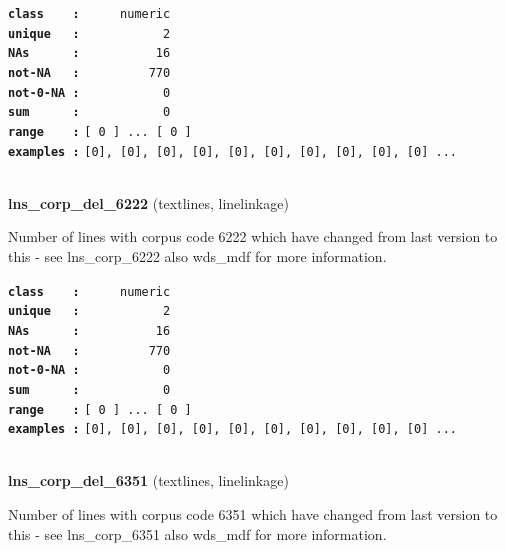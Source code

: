 \documentclass[]{article}
\begin{document}
\textbf{\texttt{class\ \ \ \ :}} \texttt{~~~~~numeric}\\
\textbf{\texttt{unique\ \ \ :}} \texttt{~~~~~~~~~~~2}\\
\textbf{\texttt{NAs\ \ \ \ \ \ :}} \texttt{~~~~~~~~~~16}\\
\textbf{\texttt{not-NA\ \ \ :}} \texttt{~~~~~~~~~770}\\
\textbf{\texttt{not-0-NA\ :}} \texttt{~~~~~~~~~~~0}\\
\textbf{\texttt{sum\ \ \ \ \ \ :}} \texttt{~~~~~~~~~~~0}\\
\textbf{\texttt{range\ \ \ \ :}}
\texttt{{[}\ 0\ {]}\ ...\ {[}\ 0\ {]}}\\
\textbf{\texttt{examples\ :}}
\texttt{{[}0{]},\ {[}0{]},\ {[}0{]},\ {[}0{]},\ {[}0{]},\ {[}0{]},\ {[}0{]},\ {[}0{]},\ {[}0{]},\ {[}0{]}\ ...}\\

~

\textbf{lns\_corp\_del\_6222} (textlines, linelinkage)

Number of lines with corpus code 6222 which have changed from last
version to this - see lns\_corp\_6222 also wds\_mdf for more
information.

\textbf{\texttt{class\ \ \ \ :}} \texttt{~~~~~numeric}\\
\textbf{\texttt{unique\ \ \ :}} \texttt{~~~~~~~~~~~2}\\
\textbf{\texttt{NAs\ \ \ \ \ \ :}} \texttt{~~~~~~~~~~16}\\
\textbf{\texttt{not-NA\ \ \ :}} \texttt{~~~~~~~~~770}\\
\textbf{\texttt{not-0-NA\ :}} \texttt{~~~~~~~~~~~0}\\
\textbf{\texttt{sum\ \ \ \ \ \ :}} \texttt{~~~~~~~~~~~0}\\
\textbf{\texttt{range\ \ \ \ :}}
\texttt{{[}\ 0\ {]}\ ...\ {[}\ 0\ {]}}\\
\textbf{\texttt{examples\ :}}
\texttt{{[}0{]},\ {[}0{]},\ {[}0{]},\ {[}0{]},\ {[}0{]},\ {[}0{]},\ {[}0{]},\ {[}0{]},\ {[}0{]},\ {[}0{]}\ ...}\\

~

\textbf{lns\_corp\_del\_6351} (textlines, linelinkage)

Number of lines with corpus code 6351 which have changed from last
version to this - see lns\_corp\_6351 also wds\_mdf for more
information.
\end{document}
